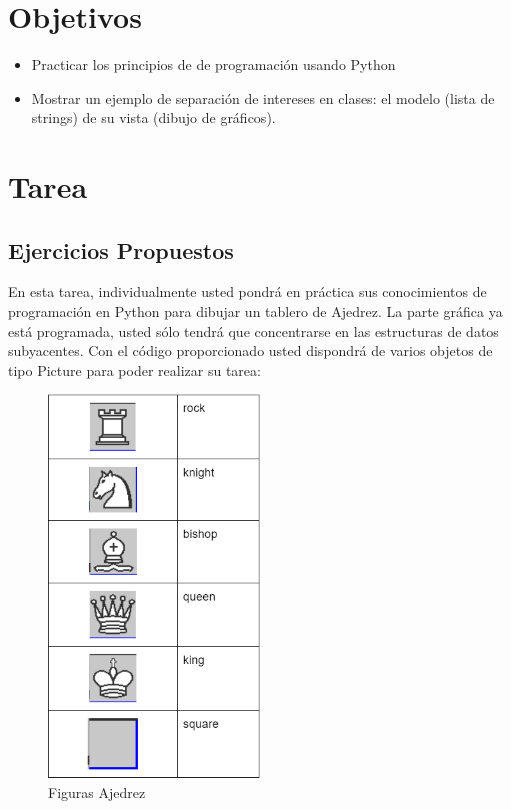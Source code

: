 \documentclass{article}
\begin{document}
  \section{Objetivos}
  \begin{itemize}
    \item Practicar los principios de de programación usando Python
    \item Mostrar un ejemplo de separación de intereses en clases: el modelo (lista de strings) de su vista (dibujo de gráficos).
  \end{itemize}

 
	\section{Tarea}
  
    
  \subsection{Ejercicios Propuestos}
  En esta tarea, individualmente usted pondrá en práctica sus conocimientos de programación en Python 
  para dibujar un tablero de Ajedrez. La parte gráfica ya está programada, usted sólo tendrá que concentrarse 
  en las estructuras de datos subyacentes. Con el código proporcionado usted dispondrá de varios objetos de 
  tipo Picture para poder realizar su tarea:
  \begin{figure}[H]
    \centering
    \includegraphics[width=0.5\textwidth, keepaspectratio]{img/figuras.png}
    \caption{Figuras Ajedrez}
  \end{figure}
  \newpage
  
\end{document}
